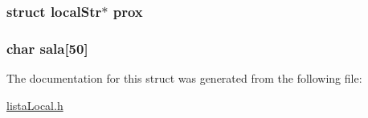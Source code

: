 \subsubsection[{prox}]{\setlength{\rightskip}{0pt plus 5cm}struct {\bf local\+Str}$\ast$ prox}\label{structlocal_str_a81e40b3db618c3787a8b78834e89145e}
\hypertarget{structlocal_str_a7609c4270fb3307a06848edee43c1957}{}
\subsubsection[{sala}]{\setlength{\rightskip}{0pt plus 5cm}char sala\mbox{[}50\mbox{]}}\label{structlocal_str_a7609c4270fb3307a06848edee43c1957}


The documentation for this struct was generated from the following file\+:\begin{DoxyCompactItemize}
\item 
\hyperlink{lista_local_8h}{lista\+Local.\+h}\end{DoxyCompactItemize}
